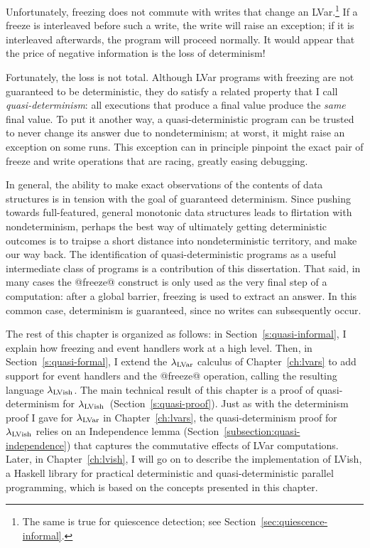 Unfortunately, freezing does not commute with writes that change an
LVar.\footnote{The same is true for quiescence detection; see
  Section~\ref{sec:quiescence-informal}.}  If a freeze is interleaved
before such a write, the write will raise an exception; if it is
interleaved afterwards, the program will proceed normally.  It would
appear that the price of negative information is the loss of
determinism!

Fortunately, the loss is not total.  Although LVar programs with
freezing are not guaranteed to be deterministic, they do satisfy a
related property that I call \emph{quasi-determinism}: all executions
that produce a final value produce the \emph{same} final value.  To
put it another way, a quasi-deterministic program can be trusted to
never change its answer due to nondeterminism; at worst, it might
raise an exception on some runs.  This exception can in principle
pinpoint the exact pair of freeze and write operations that are
racing, greatly easing debugging.

In general, the ability to make exact observations of the contents of
data structures is in tension with the goal of guaranteed determinism.
Since pushing towards full-featured, general monotonic data structures
leads to flirtation with nondeterminism, perhaps the best way of
ultimately getting deterministic outcomes is to traipse a short
distance into nondeterministic territory, and make our way back.  The
identification of quasi-deterministic programs as a useful
intermediate class of programs is a contribution of this dissertation.
That said, in many cases the @freeze@ construct is only used as the
very final step of a computation: after a global barrier, freezing is
used to extract an answer.  In this common case, determinism is
guaranteed, since no writes can subsequently occur.

The rest of this chapter is organized as follows: in
Section~\ref{s:quasi-informal}, I explain how freezing and event
handlers work at a high level.  Then, in Section~\ref{s:quasi-formal},
I extend the $\lambda_{\textrm{LVar}}$ calculus of Chapter~\ref{ch:lvars} to add
support for event handlers and the @freeze@ operation, calling the
resulting language $\lambda_{\textrm{LVish}}$.  The main technical result of this
chapter is a proof of quasi-determinism for
$\lambda_{\textrm{LVish}}$~(Section~\ref{s:quasi-proof}). Just as with the
determinism proof I gave for $\lambda_{\textrm{LVar}}$ in Chapter~\ref{ch:lvars},
the quasi-determinism proof for $\lambda_{\textrm{LVish}}$ relies on an
Independence lemma (Section~\ref{subsection:quasi-independence}) that
captures the commutative effects of LVar computations.  Later, in
Chapter~\ref{ch:lvish}, I will go on to describe the implementation of
LVish, a Haskell library for practical deterministic and
quasi-deterministic parallel programming, which is based on the
concepts presented in this chapter.

